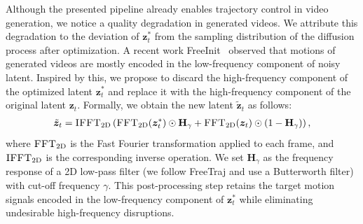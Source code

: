 Although the presented pipeline already enables trajectory control in video generation, we notice a quality degradation in generated videos.
We attribute this degradation to the deviation of $\bm{z}_t^{*}$ from the sampling distribution of the diffusion process after optimization. 
A recent work FreeInit~\citep{wu2023freeinit} observed that motions of generated videos are mostly encoded in the low-frequency component of noisy latent.
Inspired by this, we propose to discard the high-frequency component of the optimized latent $\bm{z}_t^*$ and replace it with the high-frequency component of the original latent $\bm{z}_t$. 
Formally, we obtain the new latent $\tilde{\bm{z}}_t$ as follows:
\begin{equation}
\begin{aligned}
    \tilde{\bm{z}}_t = \textsc{IFFT}_{\mathrm{2D}}\left(\textsc{FFT}_{\mathrm{2D}}(\bm{z}_t^*) \odot \mathbf{H}_\gamma + \textsc{FFT}_{\mathrm{2D}}(\bm{z}_t) \odot (1 - \mathbf{H}_\gamma)\right),
\end{aligned}
\end{equation}
where $\textsc{FFT}_{\mathrm{2D}}$ is the Fast Fourier transformation applied to each frame, and $\textsc{IFFT}_{\mathrm{2D}}$ is the corresponding inverse operation.
We set $\mathbf{H}_\gamma$ as the frequency response of a 2D low-pass filter (we follow FreeTraj and use a Butterworth filter) with cut-off frequency $\gamma$.
This post-processing step retains the target motion signals encoded in the low-frequency component of $\bm{z}^*_t$ while eliminating undesirable high-frequency disruptions. %
